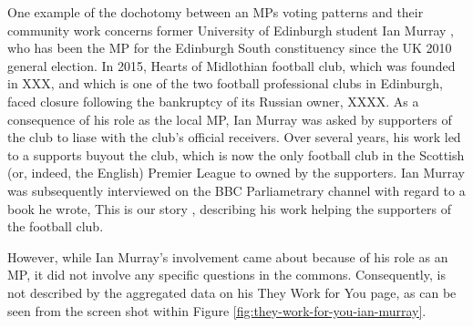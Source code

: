 One example of the dochotomy between an MPs voting patterns and their community work concerns former University of Edinburgh student Ian Murray \cite{ian-murray}, who has been the MP for the Edinburgh South constituency since the UK 2010 general election. 
In 2015, Hearts of Midlothian football club, which was founded in XXX, and which is one of the two football professional clubs in Edinburgh, faced closure following the bankruptcy of its Russian owner, XXXX.
As a consequence of his role as the local MP, Ian Murray was asked by supporters of the club to liase with the club's official receivers.
Over several years, his work led to a supports buyout the club, which is now the only football club in the Scottish (or, indeed, the English) Premier League to owned by the supporters.
Ian Murray was subsequently interviewed \cite{ian-murray-bbc} on the BBC Parliametrary channel \cite{bbc-parliament} with regard to a book he wrote, This is our story \cite{ian-murray-this-is-our-story}, describing his work helping the supporters of the football club.

However, while Ian Murray’s involvement came about because of his role as an MP, it did not involve any specific questions in the commons.
Consequently, is not described by the aggregated data on his They Work for You page, as can be seen from the screen shot within Figure \ref{fig:they-work-for-you-ian-murray}.

